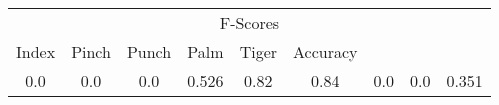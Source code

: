 \documentclass{standalone}
\begin{document}
 
 \begin{tabular}{|c|c|c|c|c|c|c|c ||c|}
\cline{1-9}\multicolumn{9}{|c|}{F-Scores} \\ 
\cline{1-9}Index & Pinch & Punch & Palm & Tiger & Accuracy\\ 
\cline{1-9}0.0 & 0.0 & 0.0 & 0.526 & 0.82 & 0.84 & 0.0 & 0.0 & 0.351\\ 
 \cline{1-9}\hline \end{tabular}
 
\end{document}
